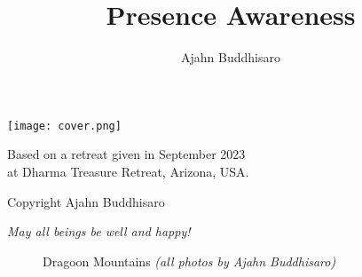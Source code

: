 \documentclass[12pt,openany]{book}
\title{Presence Awareness}
\author{Ajahn Buddhisaro}
\date{}
\begin{document}
\frontmatter
\pagestyle{empty}

\hspace*{-159mm}
\texttt{[image: cover.png]}



\maketitle


\newpage
\restoregeometry

\begin{center}\end{center}

\vspace{4em}
{\small
\noindent Based on a retreat given in September 2023 \\at Dharma Treasure Retreat, Arizona, USA.

\bigskip

\noindent Copyright Ajahn Buddhisaro

}

\vfill

\begin{center}
\textit{May all beings be well and happy!}

\end{center}
\vfill

\newpage

\tableofcontents

\bigskip

\vfill

\begin{figure}[h]
    \centering
    \caption*{Dragoon Mountains \textit{(all photos by Ajahn Buddhisaro)}}
\end{figure}
\end{document}
